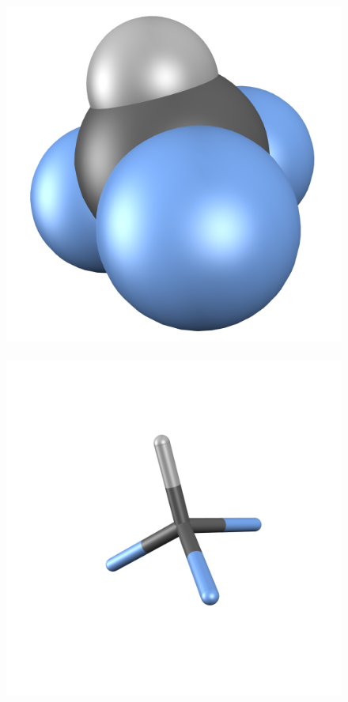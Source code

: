 \documentclass[a4paper,12pt]{article}
\begin{document}
\begin{figure}[h]
\begin{center}
\includegraphics[scale=0.18]{figures/CHF3-space.png}\hspace{-3mm}~
\includegraphics[scale=0.18]{figures/CHF3-tubes.png}\hspace{-3mm}~

\end{center}
\end{figure}
\end{document}
